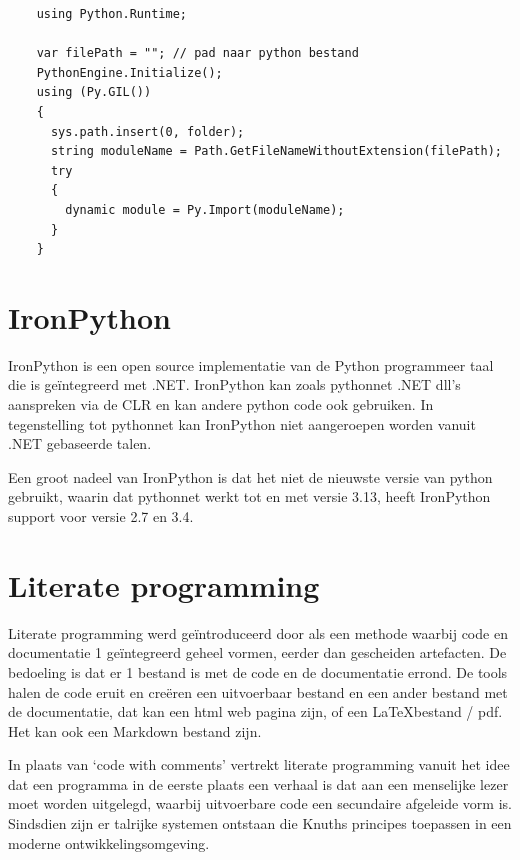 \begin{listing}
	\begin{verbatim}
    using Python.Runtime;

    var filePath = ""; // pad naar python bestand
    PythonEngine.Initialize();
    using (Py.GIL())
    {
      sys.path.insert(0, folder);
      string moduleName = Path.GetFileNameWithoutExtension(filePath);
      try
      {
        dynamic module = Py.Import(moduleName);
      }
    }

  \end{verbatim}
	\caption[C\# code fragment]{C\# code die een python file inleest en beschikbaar maakt voor uitvoer}
\end{listing}

\section{IronPython}

IronPython \autocite{IronPython} is een open source implementatie van de Python programmeer taal die is geïntegreerd met .NET.
IronPython kan zoals pythonnet .NET dll's aanspreken via de CLR en kan andere python code ook gebruiken.
In tegenstelling tot pythonnet kan IronPython niet aangeroepen worden vanuit .NET gebaseerde talen.

Een groot nadeel van IronPython is dat het niet de nieuwste versie van python gebruikt, waarin dat pythonnet werkt tot en met versie 3.13,
heeft IronPython support voor versie 2.7 en 3.4. \autocite{IronPython}

\section{Literate programming}
Literate programming \autocite{LiterateProgramming} werd geïntroduceerd door \textcite{Knuth1984} als een methode waarbij code en documentatie 1 geïntegreerd geheel vormen, eerder dan gescheiden artefacten. De bedoeling is dat er 1 bestand is met de code en de documentatie errond. De tools halen de code eruit en creëren een uitvoerbaar bestand en een ander bestand met de documentatie, dat kan een html web pagina zijn, of een \LaTeX \@ bestand / pdf. Het kan ook een Markdown bestand zijn.

In plaats van `code with comments' vertrekt literate programming vanuit het idee dat een programma in de eerste plaats een verhaal is dat aan een menselijke lezer moet worden uitgelegd, waarbij uitvoerbare code een secundaire afgeleide vorm is. \autocite{Knuth1984}
Sindsdien zijn er talrijke systemen ontstaan die Knuths principes toepassen in een moderne ontwikkelingsomgeving.

